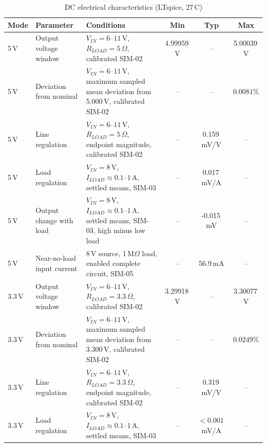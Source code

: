 \documentclass[conference]{IEEEtran}
\begin{document}
\begin{table}[t]
\centering
\footnotesize
\setlength{\tabcolsep}{4pt}
\caption{DC electrical characteristics (LTspice, 27\,\textdegree C)}
\label{tab:dc_characteristics}
\begin{tabularx}{\textwidth}{@{}L{1.4cm}L{3.8cm}Xccc@{}}
\toprule
\textbf{Mode} & \textbf{Parameter} & \textbf{Conditions} & \textbf{Min} & \textbf{Typ} & \textbf{Max} \\
\midrule

5\,V & Output voltage window &
$V_{IN}=6$--$11$\,V, $R_{LOAD}=5\,\Omega$, calibrated SIM-02 &
4.99959\,V & -- & 5.00039\,V \\

5\,V & Deviation from nominal &
$V_{IN}=6$--$11$\,V, maximum sampled mean deviation from 5.000\,V, calibrated SIM-02 &
-- & -- & $0.0081\%$ \\

5\,V & Line regulation &
$V_{IN}=6$--$11$\,V, $R_{LOAD}=5\,\Omega$, endpoint magnitude, calibrated SIM-02 &
-- & 0.159\,mV/V & -- \\

5\,V & Load regulation &
$V_{IN}=8$\,V, $I_{LOAD}\approx0.1$--$1$\,A, settled means, SIM-03 &
-- & 0.017\,mV/A & -- \\

5\,V & Output change with load &
$V_{IN}=8$\,V, $I_{LOAD}\approx0.1$--$1$\,A, settled means, SIM-03, high minus low load &
-- & -0.015\,mV & -- \\



5\,V & Near-no-load input current &
8\,V source, 1\,M$\Omega$ load, enabled complete circuit, SIM-05 &
-- & 56.9\,mA & -- \\

\midrule

3.3\,V & Output voltage window &
$V_{IN}=6$--$11$\,V, $R_{LOAD}=3.3\,\Omega$, calibrated SIM-02 &
3.29918\,V & -- & 3.30077\,V \\

3.3\,V & Deviation from nominal &
$V_{IN}=6$--$11$\,V, maximum sampled mean deviation from 3.300\,V, calibrated SIM-02 &
-- & -- & $0.0249\%$ \\

3.3\,V & Line regulation &
$V_{IN}=6$--$11$\,V, $R_{LOAD}=3.3\,\Omega$, endpoint magnitude, calibrated SIM-02 &
-- & 0.319\,mV/V & -- \\

3.3\,V & Load regulation &
$V_{IN}=8$\,V, $I_{LOAD}\approx0.1$--$1$\,A, settled means, SIM-03 &
-- & $<0.001$\,mV/A & -- \\


\end{tabularx}
\end{table}
\end{document}
